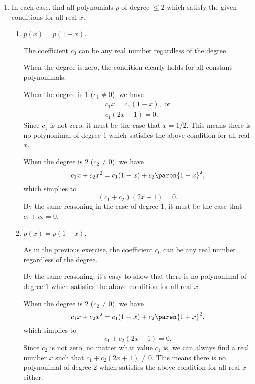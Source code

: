 \documentclass[a4paper]{article}
\begin{document}
\begin{enumerate}
\item In each case, find all polynomials \(p\) of degree \(\le 2\) which
  satisfy the given conditions for all real \(x\).
  \begin{enumerate}
  \item \(p(x) = p(1-x)\).

    The coefficient \(c_0\) can be any real number regardless of the
    degree.

    When the degree is zero, the condition clearly holds for all constant
    polynonimals.

    When the degree is \(1\) (\(c_1 \ne 0\)), we have
    \begin{gather*}
      c_1 x = c_1 (1-x), \text{ or} \\
      c_1 (2x-1) = 0.
    \end{gather*}
    Since \(c_1\) is not zero, it must be the case that \(x = 1/2\).  This
    means there is no polynonimal of degree \(1\) which satisfies the
    above condition for all real \(x\).

    When the degree is \(2\) (\(c_2 \ne 0\)), we have
    \begin{displaymath}
      c_1 x + c_2 x^2 = c_1 (1-x) + c_2 \paren{1-x}^2,
    \end{displaymath}
    which simplies to
    \begin{displaymath}
      (c_1 + c_2)(2x - 1) = 0.
    \end{displaymath}
    By the same reasoning in the case of degree \(1\), it must be the case
    that \(c_1 + c_2 = 0\).

  \item \(p(x) = p(1+x)\).

    As in the previous exercise, the coefficient \(c_0\) can be any real
    number regardless of the degree.

    By the same reasoning, it's easy to show that there is no polynonimal
    of degree \(1\) which satisfies the above condition for all real
    \(x\).

    When the degree is \(2\) (\(c_2 \ne 0\)), we have
    \begin{displaymath}
      c_1 x + c_2 x^2 = c_1 (1+x) + c_2 \paren{1+x}^2,
    \end{displaymath}
    which simplies to
    \begin{displaymath}
      c_1 + c_2 (2x+1) = 0.
    \end{displaymath}
    Since \(c_2\) is not zero, no matter what value \(c_1\) is, we can
    always find a real number \(x\) such that \(c_1 + c_2 (2x+1) \ne 0\).
    This means there is no polynonimal of degree \(2\) which satisfies the
    above condition for all real \(x\) either.


\end{enumerate}
\end{enumerate}
\end{document}
